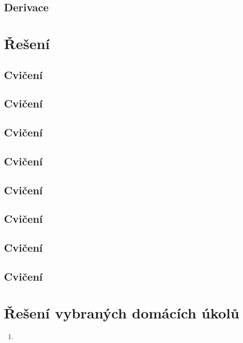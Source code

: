 \documentclass[a4paper,10pt]{book}
\begin{document}
	\section{Derivace}
	  
	  

\chapter{Řešení}
	\renewcommand{\solution}[1]{
		\emph{Řešení:}
		#1
	}
	\renewcommand{\exercise}[2]{ %
		\label{sol:#2}
		
		\newpage
	}
	\section[1. Cvičení]{Cvičení}
 
	\section[2. Cvičení]{Cvičení}
 
	\section[3. Cvičení]{Cvičení}
 
	\section[4. Cvičení]{Cvičení}
 
	\section[5. Cvičení]{Cvičení}
 
	\section[6. Cvičení]{Cvičení}
 
	\section[7. Cvičení]{Cvičení}
 
	\section[8. Cvičení]{Cvičení}
 

\chapter{Řešení vybraných domácích úkolů}

\begin{enumerate}
	\item  \exercise{homework/charakterizace_kdy_omezena_nema_limitu.tex}{charakterizace_nema_limitu}
\end{enumerate}
\end{document}
